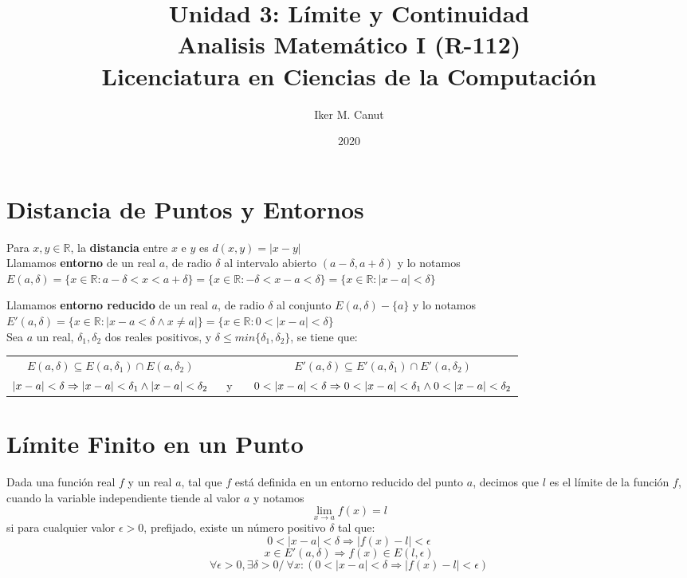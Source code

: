 \documentclass[11pt,a4paper]{article}
\author{Iker M. Canut}
\title{Unidad 3: L\'imite y Continuidad\\ Analisis Matem\'atico I (R-112)\\Licenciatura en Ciencias de la Computaci\'on}
\date{2020}
\begin{document}
\maketitle
\newpage

\section{Distancia de Puntos y Entornos}
Para $x,y \in \mathbb{R}$, la \textbf{distancia} entre $x$ e $y$ es $d(x,y) = |x-y|$\\

Llamamos \textbf{entorno} de un real $a$, de radio $\delta$ al intervalo abierto $(a-\delta, a+\delta)$ y lo notamos\\ $E(a,\delta) = \{x\in\mathbb{R}:a-\delta<x<a+\delta\} = \{x\in\mathbb{R}:-\delta<x-a<\delta\} = \{x\in\mathbb{R}:|x-a|<\delta\}$

Llamamos \textbf{entorno reducido} de un real $a$, de radio $\delta$ al conjunto $E(a,\delta) - \{a\}$ y lo notamos $E'(a,\delta) = \{x\in\mathbb{R}:|x-a<\delta\land x\not = a|\} = \{x\in\mathbb{R}:0<|x-a|<\delta\}$\\

Sea $a$ un real, $\delta_1, \delta_2$ dos reales positivos, y $\delta\leq min\{\delta_1, \delta_2\}$, se tiene que:
\begin{table}[h]
\centering
\begin{tabular}{ccc}
$E(a,\delta) \subseteq E(a,\delta_1) \cap E(a,\delta_2)$ & \ \ \ \ & $E'(a,\delta) \subseteq E'(a,\delta_1) \cap E'(a,\delta_2)$\\
$|x-a|<\delta \Rightarrow |x-a|<\delta_1 \land |x-a|<\delta_2 \hfill$ & \ y \ & $\hfill 0<|x-a|<\delta \Rightarrow 0<|x-a|<\delta_1 \land 0<|x-a|<\delta_2$
\end{tabular}
\end{table}

\section{L\'imite Finito en un Punto}
Dada una funci\'on real $f$ y un real $a$, tal que $f$ est\'a definida en un entorno reducido del punto $a$, decimos que $l$ es el l\'imite de la funci\'on $f$, cuando la variable independiente tiende al valor $a$ y notamos $$\lim_{x\to a}f(x)=l$$ si para cualquier valor $\epsilon > 0$, prefijado, existe un n\'umero positivo $\delta$ tal que: $$0<|x-a|<\delta \Rightarrow |f(x)-l| < \epsilon$$ $$x \in E'(a, \delta) \Rightarrow f(x) \in E(l, \epsilon)$$ $$\forall \epsilon > 0, \exists \delta > 0 /\ \forall x : (0 < |x-a| < \delta \Rightarrow |f(x)-l|<\epsilon)$$\\
\end{document}
